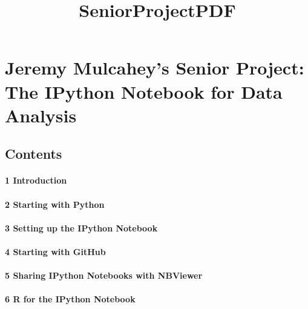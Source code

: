 \documentclass{article}
\title{SeniorProjectPDF}
\begin{document}
    
    
    \maketitle
    
    

    

    \section{Jeremy Mulcahey's Senior Project: The IPython Notebook for Data Analysis}



    \subsection{Contents}



    \paragraph{1 Introduction}


    


    \paragraph{2 Starting with Python}


    


    \paragraph{3 Setting up the IPython Notebook}


    


    \paragraph{4 Starting with GitHub}


    


    \paragraph{5 Sharing IPython Notebooks with NBViewer}



    \paragraph{6 R for the IPython Notebook}
\end{document}
